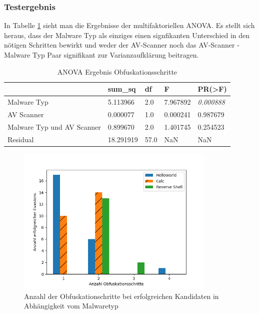  \subsubsection{Testergebnis}
 In Tabelle \ref{tab:ANOVA} sieht man die Ergebnisse der multifaktoriellen ANOVA. Es stellt sich heraus, dass der Malware Typ als einziges einen signfikanten Unterschied in den nötigen Schritten bewirkt und weder der AV-Scanner noch das AV-Scanner - Malware Typ Paar signifikant zur Varianzaufklärung beitragen.
\begin{table}[hp]
\begin{tabular}{@{}lllll@{}}
\toprule
                           & sum\_sq   & df   & F        & PR(\textgreater{}F) \\ \midrule
Malware Typ                & 5.113966  & 2.0  & 7.967892 & \textit{0.000888}            \\
AV Scanner                 & 0.000077  & 1.0  & 0.000241 & 0.987679            \\
Malware Typ und AV Scanner & 0.899670  & 2.0  & 1.401745 & 0.254523            \\
Residual                   & 18.291919 & 57.0 & NaN      & NaN                 \\ \bottomrule
\end{tabular}
\caption{ANOVA Ergebnis Obfuskationsschritte}
\label{tab:ANOVA}
\end{table} 
\begin{figure}[h]
    \centering
    \includegraphics[width=0.85\textwidth]{gfx/Hypothesendiagramme/combined_obfuscation_steps.png}
    \caption{Anzahl der Obfuskationschritte bei erfolgreichen Kandidaten in Abhängigkeit vom Malwaretyp}
    \label{fig:steps_per_Solve}
\end{figure}

